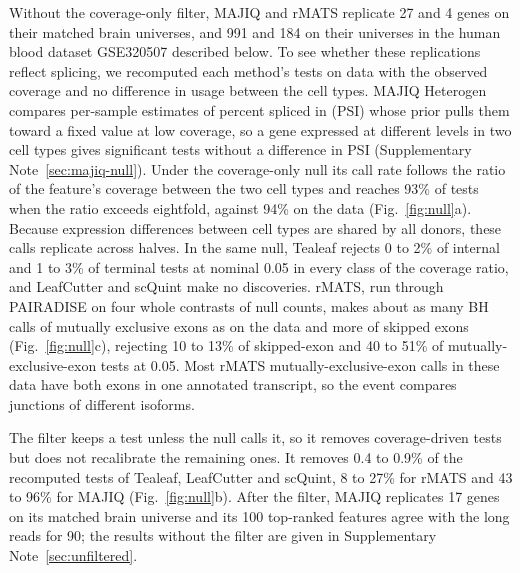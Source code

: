 \documentclass[11pt]{article}
\begin{document}
Without the coverage-only filter, MAJIQ and rMATS replicate 27 and 4 genes on their matched brain universes, and 991 and 184 on their universes in the human blood dataset GSE320507 described below. To see whether these replications reflect splicing, we recomputed each method's tests on data with the observed coverage and no difference in usage between the cell types. MAJIQ Heterogen compares per-sample estimates of percent spliced in (PSI) whose prior pulls them toward a fixed value at low coverage, so a gene expressed at different levels in two cell types gives significant tests without a difference in PSI (Supplementary Note~\ref{sec:majiq-null}). Under the coverage-only null its call rate follows the ratio of the feature's coverage between the two cell types and reaches 93\% of tests when the ratio exceeds eightfold, against 94\% on the data (Fig.~\ref{fig:null}a). Because expression differences between cell types are shared by all donors, these calls replicate across halves. In the same null, Tealeaf rejects 0 to 2\% of internal and 1 to 3\% of terminal tests at nominal 0.05 in every class of the coverage ratio, and LeafCutter and scQuint make no discoveries. rMATS, run through PAIRADISE on four whole contrasts of null counts, makes about as many BH calls of mutually exclusive exons as on the data and more of skipped exons (Fig.~\ref{fig:null}c), rejecting 10 to 13\% of skipped-exon and 40 to 51\% of mutually-exclusive-exon tests at 0.05. Most rMATS mutually-exclusive-exon calls in these data have both exons in one annotated transcript, so the event compares junctions of different isoforms.

The filter keeps a test unless the null calls it, so it removes coverage-driven tests but does not recalibrate the remaining ones. It removes 0.4 to 0.9\% of the recomputed tests of Tealeaf, LeafCutter and scQuint, 8 to 27\% for rMATS and 43 to 96\% for MAJIQ (Fig.~\ref{fig:null}b). After the filter, MAJIQ replicates 17 genes on its matched brain universe and its 100 top-ranked features agree with the long reads for 90; the results without the filter are given in Supplementary Note~\ref{sec:unfiltered}.
\end{document}
